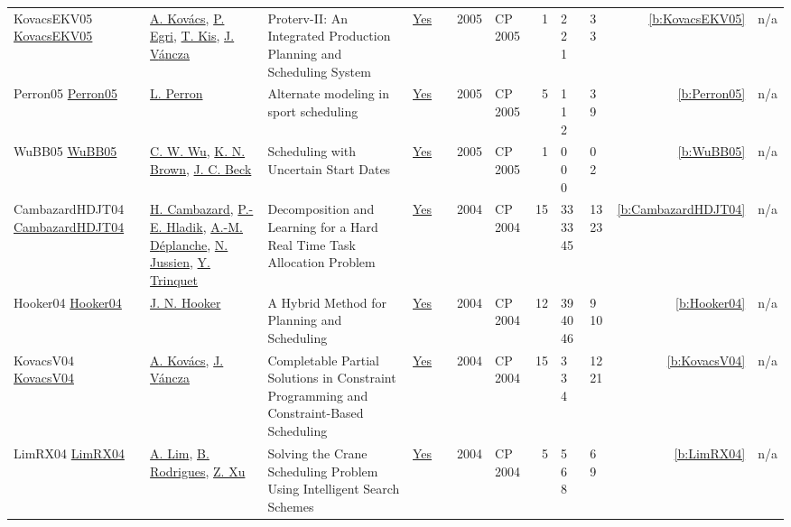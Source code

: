 {\begin{longtable}{>{\raggedright\arraybackslash}p{3cm}>{\raggedright\arraybackslash}p{4.5cm}>{\raggedright\arraybackslash}p{6.0cm}rrrp{2.5cm}rp{1cm}p{1cm}rr}
KovacsEKV05 \href{https://doi.org/10.1007/11564751_118}{KovacsEKV05} & \hyperref[auth:a146]{A. Kov{\'{a}}cs}, \hyperref[auth:a277]{P. Egri}, \hyperref[auth:a155]{T. Kis}, \hyperref[auth:a278]{J. V{\'{a}}ncza} & Proterv-II: An Integrated Production Planning and Scheduling System & \href{../works/KovacsEKV05.pdf}{Yes} & \cite{KovacsEKV05} & 2005 & CP 2005 & 1 & 2 2 1 & 3 3 & \ref{b:KovacsEKV05} & n/a\\
Perron05 \href{https://doi.org/10.1007/11564751_67}{Perron05} & \hyperref[auth:a288]{L. Perron} & Alternate modeling in sport scheduling & \href{../works/Perron05.pdf}{Yes} & \cite{Perron05} & 2005 & CP 2005 & 5 & 1 1 2 & 3 9 & \ref{b:Perron05} & n/a\\
WuBB05 \href{https://doi.org/10.1007/11564751_110}{WuBB05} & \hyperref[auth:a274]{C. W. Wu}, \hyperref[auth:a217]{K. N. Brown}, \hyperref[auth:a89]{J. C. Beck} & Scheduling with Uncertain Start Dates & \href{../works/WuBB05.pdf}{Yes} & \cite{WuBB05} & 2005 & CP 2005 & 1 & 0 0 0 & 0 2 & \ref{b:WuBB05} & n/a\\
CambazardHDJT04 \href{https://doi.org/10.1007/978-3-540-30201-8_14}{CambazardHDJT04} & \hyperref[auth:a999]{H. Cambazard}, \hyperref[auth:a1061]{P.-E. Hladik}, \hyperref[auth:a1062]{A.-M. D{\'{e}}planche}, \hyperref[auth:a247]{N. Jussien}, \hyperref[auth:a1063]{Y. Trinquet} & Decomposition and Learning for a Hard Real Time Task Allocation Problem & \href{../works/CambazardHDJT04.pdf}{Yes} & \cite{CambazardHDJT04} & 2004 & CP 2004 & 15 & 33 33 45 & 13 23 & \ref{b:CambazardHDJT04} & n/a\\
Hooker04 \href{https://doi.org/10.1007/978-3-540-30201-8_24}{Hooker04} & \hyperref[auth:a160]{J. N. Hooker} & \cellcolor{green!10}A Hybrid Method for Planning and Scheduling & \href{../works/Hooker04.pdf}{Yes} & \cite{Hooker04} & 2004 & CP 2004 & 12 & 39 40 46 & 9 10 & \ref{b:Hooker04} & n/a\\
KovacsV04 \href{https://doi.org/10.1007/978-3-540-30201-8_26}{KovacsV04} & \hyperref[auth:a146]{A. Kov{\'{a}}cs}, \hyperref[auth:a278]{J. V{\'{a}}ncza} & \cellcolor{green!10}Completable Partial Solutions in Constraint Programming and Constraint-Based Scheduling & \href{../works/KovacsV04.pdf}{Yes} & \cite{KovacsV04} & 2004 & CP 2004 & 15 & 3 3 4 & 12 21 & \ref{b:KovacsV04} & n/a\\
LimRX04 \href{https://doi.org/10.1007/978-3-540-30201-8_59}{LimRX04} & \hyperref[auth:a279]{A. Lim}, \hyperref[auth:a280]{B. Rodrigues}, \hyperref[auth:a281]{Z. Xu} & Solving the Crane Scheduling Problem Using Intelligent Search Schemes & \href{../works/LimRX04.pdf}{Yes} & \cite{LimRX04} & 2004 & CP 2004 & 5 & 5 6 8 & 6 9 & \ref{b:LimRX04} & n/a\\

\end{longtable}}
